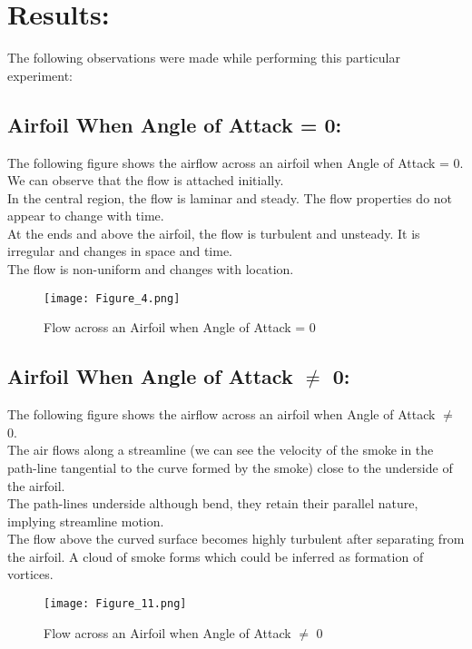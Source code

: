 \documentclass[12pt,a4paper]{article}
\begin{document}
\section{Results:}
The following observations were made while performing this particular experiment:
\subsection{Airfoil When Angle of Attack = 0:}
The following figure shows the airflow across an airfoil when Angle of Attack = 0.\\
We can observe that the flow is attached initially.\\
In the central region, the flow is laminar and steady. The flow properties do not appear to change with time.\\
At the ends and above the airfoil, the flow is turbulent and unsteady. It is irregular and changes in space and time.\\
The flow is non-uniform and changes with location.
\begin{figure}[!ht]
	\begin{center}
			\texttt{[image: Figure\_4.png]}
	\end{center}
	\caption{Flow across an Airfoil when Angle of Attack = 0}
\end{figure}
\newpage
\subsection{Airfoil When Angle of Attack $\neq$ 0:}
The following figure shows the airflow across an airfoil when Angle of Attack $\neq$ 0.\\
The air flows along a streamline (we can see the velocity of the smoke in the path-line tangential to the curve formed by the smoke) close to the underside of the airfoil.\\
The path-lines underside although bend, they retain their parallel nature, implying streamline motion.\\
The flow above the curved surface becomes highly turbulent after separating from the airfoil. A cloud of smoke forms which could be inferred as formation of vortices.
\begin{figure}[!ht]
	\begin{center}
			\texttt{[image: Figure\_11.png]}
	\end{center}
	\caption{Flow across an Airfoil when Angle of Attack $\neq$ 0}
\end{figure}
\end{document}
